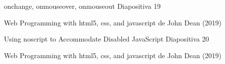 \begin{frame}{onchange, onmouseover, onmouseout}
\justifying
Diapositiva 19


{\tiny Web Programming with html5, css, and javascript de John Dean (2019)}
\end{frame}


\begin{frame}{Using noscript to Accommodate Disabled JavaScript}
\justifying
Diapositiva 20


{\tiny Web Programming with html5, css, and javascript de John Dean (2019)}
\end{frame}
